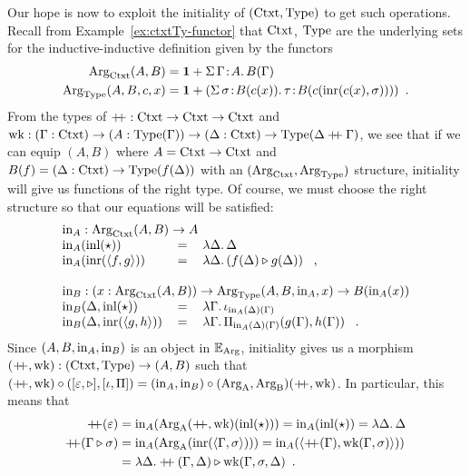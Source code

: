 \documentclass[orivec,envcountsame, ,envcountsect]{llncs}
\begin{document}
Our hope is now to exploit the initiality of $(\text{Ctxt}, \text{Type})$ to get
such operations. Recall from Example~\ref{ex:ctxtTy-functor} that
$\text{Ctxt}$, $\text{Type}$ are the underlying sets for the inductive-inductive
definition given by the functors
\begin{align*}
  \text{Arg}_{\text{Ctxt}}(A, B) &= \mathbf{1} + \Sigma\, \Gamma\!:\!A .\, B(\Gamma)\\
  \text{Arg}_{\text{Type}}(A, B, c, x) &= \mathbf{1} + (\Sigma\,  \sigma\!:\! B(c(x)).\, \tau\!:\!B(c(\text{inr}(c(x), \sigma))) ) \enspace .
\end{align*} 
From the types of $\mathbin{+\mkern-6mu+} : \text{Ctxt} \to \text{Ctxt} \to \text{Ctxt}$ and $\text{wk} :
(\Gamma : \text{Ctxt}) \to (A : \text{Type}(\Gamma)) \to (\Delta : \text{Ctxt}) \to
\text{Type}(\Delta \mathbin{+\mkern-6mu+} \Gamma)$, we see that if we can equip $(A,
B)$ where $A = \text{Ctxt} \to \text{Ctxt}$ and $B(f) = (\Delta : \text{Ctxt}) \to
\text{Type}(f(\Delta))$ with an $(\text{Arg}_{\text{Ctxt}}, \text{Arg}_{\text{Type}})$ structure, initiality
will give us functions of the right type. Of course, we must choose
the right structure so that our equations will be satisfied:
\[
\begin{tabular}{lcl}
  \multicolumn{3}{l}{$\inn_A : \ArgCtxt(A, B) \to A$} \\
  $\inn_A(\inl(\oneelt))$ &$=$& $\lambda \Delta .\, \Delta$ \\
  $\inn_A(\inr(\langle f , g\rangle))$ &$=$& $\lambda \Delta .\, (\consCtxt{f(\Delta)}{g(\Delta)})$ \enspace ,\\
\\
  \multicolumn{3}{l}{$\inn_B : (x : \ArgCtxt(A, B)) \to \ArgType(A, B, \inn_A, x) \to B(\inn_A(x))$} \\
  $\inn_B(\Delta, \inl(\oneelt))$ &$=$& $\lambda \Gamma .\, \baseTy{\inn_A(\Delta)(\Gamma)}$ \\
  $\inn_B(\Delta, \inr(\langle g , h\rangle))$ &$=$& $\lambda \Gamma .\, \piTy{\inn_A(\Delta)(\Gamma)}{g(\Gamma)}{h(\Gamma)}$ \enspace .
\end{tabular}
\]
Since $(A, B, \text{in}_A, \text{in}_B)$ is an object in
$\mathbb{E}_{\text{Arg}}$, initiality gives us a morphism $(\mathbin{+\mkern-6mu+}, \text{wk}) :
(\text{Ctxt}, \text{Type}) \to (A, B)$ such that $(\mathbin{+\mkern-6mu+}, \text{wk}) \circ
([\varepsilon, \triangleright],
[\iota, \Pi]) = (\text{in}_A, \text{in}_B) \circ (\text{Arg}_{\text{A}},
\text{Arg}_{\text{B}})(\mathbin{+\mkern-6mu+}, \text{wk})$.  In particular, this means that
\begin{align*}
\mathbin{+\mkern-6mu+}(\varepsilon) 
 &= \text{in}_A(\text{Arg}_{\text{A}}(\mathbin{+\mkern-6mu+}, \text{wk})(\text{inl}(\star)))
  = \text{in}_A(\text{inl}(\star))
  = \lambda \Delta.\, \Delta \\
\mathbin{+\mkern-6mu+}(\Gamma \triangleright \sigma)
 &= \text{in}_A(\text{Arg}_{\text{A}}(\text{inr}(\langle\Gamma, \sigma\rangle)))
  = \text{in}_A(\langle \mathbin{+\mkern-6mu+}(\Gamma), \text{wk}(\Gamma, \sigma)\rangle)) \\
  &= \lambda \Delta . \mathbin{+\mkern-6mu+}(\Gamma, \Delta) \triangleright \text{wk}(\Gamma, \sigma, \Delta) \enspace .
\end{align*}
\end{document}
